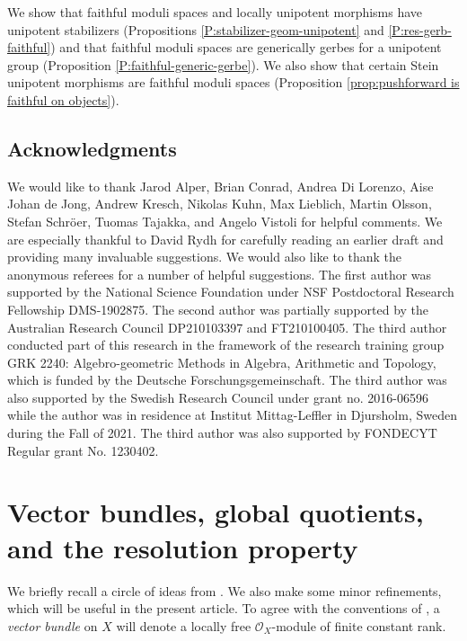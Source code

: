 \documentclass[reqno,a4paper]{amsart}
\numberwithin{Theorem}{section}
\newcommand{\Orb}{\mathcal{O}}
\theoremstyle{plain}
\theoremstyle{remark}
\begin{document}
We show that faithful moduli spaces and locally unipotent morphisms
have unipotent stabilizers (Propositions
\ref{P:stabilizer-geom-unipotent} and \ref{P:res-gerb-faithful}) and
that faithful moduli spaces are generically gerbes for a unipotent
group (Proposition \ref{P:faithful-generic-gerbe}). We also show that
certain Stein unipotent morphisms are faithful moduli spaces
(Proposition \ref{prop:pushforward is faithful on objects}). 

\subsection*{Acknowledgments} We would like to thank Jarod Alper, Brian Conrad, Andrea Di Lorenzo, Aise Johan de Jong, Andrew Kresch, Nikolas Kuhn, Max Lieblich, Martin Olsson, Stefan Schr\"oer, Tuomas Tajakka, and Angelo Vistoli for helpful comments. We are especially thankful to David Rydh for carefully reading an earlier draft and providing many invaluable suggestions. We would also like to thank the anonymous referees for a number of helpful suggestions. The first author was supported by the National Science Foundation under
NSF Postdoctoral Research Fellowship DMS-1902875. The second author was partially supported by the Australian Research Council DP210103397 and FT210100405. The third author conducted part of this research in the framework of the research training group GRK 2240: Algebro-geometric Methods in Algebra, Arithmetic and Topology, which is funded by the Deutsche Forschungsgemeinschaft. The third author was also supported by the Swedish Research Council under grant no. 2016-06596 while the author was in residence at Institut Mittag-Leffler in Djursholm, Sweden during the Fall of 2021. The third author was also supported
by FONDECYT Regular grant No. 1230402.

\section{Vector bundles, global quotients, and the resolution property}
We briefly recall a circle of ideas from
\cite{MR1844577,MR2108211,2013arXiv1306.5418G}. We also make some
minor refinements, which will be useful in the present article. To agree with the conventions of \cite[\S 5]{2013arXiv1306.5418G}, a \emph{vector bundle} on $X$ will denote a locally free $\Orb_X$-module of finite constant rank.
\end{document}
